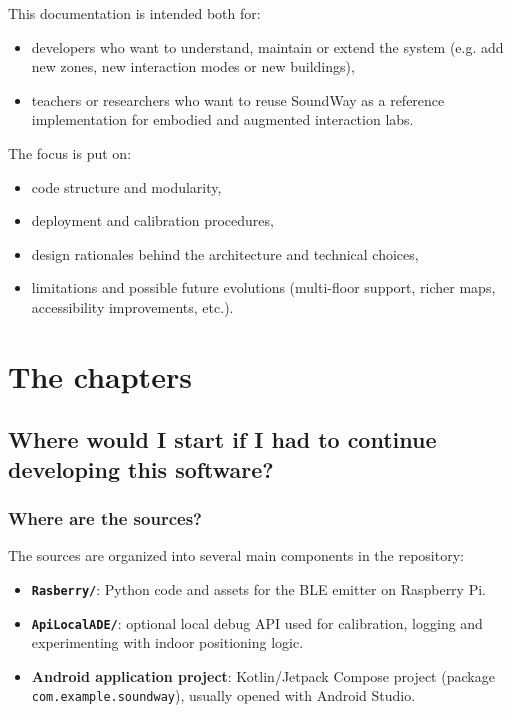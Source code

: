 \documentclass[12pt,a4paper]{article}
\begin{document}
This documentation is intended both for:
\begin{itemize}
    \item developers who want to understand, maintain or extend the system (e.g. add new zones, new interaction modes or new buildings),
    \item teachers or researchers who want to reuse SoundWay as a reference implementation for embodied and augmented interaction labs.
\end{itemize}

The focus is put on:
\begin{itemize}
    \item code structure and modularity,
    \item deployment and calibration procedures,
    \item design rationales behind the architecture and technical choices,
    \item limitations and possible future evolutions (multi-floor support, richer maps, accessibility improvements, etc.).
\end{itemize}

\pagebreak

\section{The chapters}

\subsection{Where would I start if I had to continue developing this software?}

\subsubsection{Where are the sources?}

The sources are organized into several main components in the repository:

\begin{itemize}
    \item \textbf{\texttt{Rasberry/}}: Python code and assets for the BLE emitter on Raspberry Pi.
    \item \textbf{\texttt{ApiLocalADE/}}: optional local debug API used for calibration, logging and experimenting with indoor positioning logic.
    \item \textbf{Android application project}: Kotlin/Jetpack Compose project (package \texttt{com.example.soundway}), usually opened with Android Studio.
\end{itemize}
\end{document}
